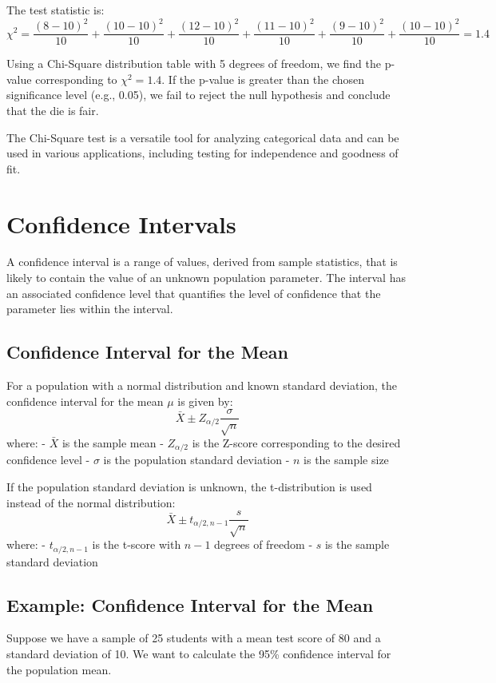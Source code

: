 \documentclass{article}
\begin{document}
The test statistic is:
\[
\chi^2 = \frac{(8 - 10)^2}{10} + \frac{(10 - 10)^2}{10} + \frac{(12 - 10)^2}{10} + \frac{(11 - 10)^2}{10} + \frac{(9 - 10)^2}{10} + \frac{(10 - 10)^2}{10} = 1.4
\]

Using a Chi-Square distribution table with 5 degrees of freedom, we find the p-value corresponding to \(\chi^2 = 1.4\). If the p-value is greater than the chosen significance level (e.g., 0.05), we fail to reject the null hypothesis and conclude that the die is fair.

The Chi-Square test is a versatile tool for analyzing categorical data and can be used in various applications, including testing for independence and goodness of fit.

\section{Confidence Intervals}
A confidence interval is a range of values, derived from sample statistics, that is likely to contain the value of an unknown population parameter. The interval has an associated confidence level that quantifies the level of confidence that the parameter lies within the interval.

\subsection{Confidence Interval for the Mean}
For a population with a normal distribution and known standard deviation, the confidence interval for the mean \(\mu\) is given by:
\[
\bar{X} \pm Z_{\alpha/2} \frac{\sigma}{\sqrt{n}}
\]
where:
- \(\bar{X}\) is the sample mean
- \(Z_{\alpha/2}\) is the Z-score corresponding to the desired confidence level
- \(\sigma\) is the population standard deviation
- \(n\) is the sample size

If the population standard deviation is unknown, the t-distribution is used instead of the normal distribution:
\[
\bar{X} \pm t_{\alpha/2, n-1} \frac{s}{\sqrt{n}}
\]
where:
- \(t_{\alpha/2, n-1}\) is the t-score with \(n-1\) degrees of freedom
- \(s\) is the sample standard deviation

\subsection{Example: Confidence Interval for the Mean}
Suppose we have a sample of 25 students with a mean test score of 80 and a standard deviation of 10. We want to calculate the 95\% confidence interval for the population mean.
\end{document}
